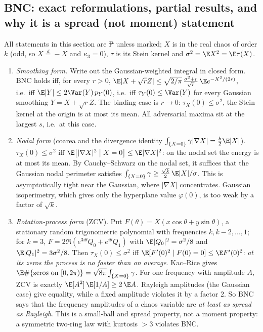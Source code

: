 \subsection{BNC: exact reformulations, partial results, and why it is a spread (not moment) statement}\label{sec:bnc-forms}
All statements in this section are \st{P} unless marked; $X$ is in the real chaos of order $k$ (odd, so $X\overset d=-X$ and $\kappa_3=0$), $\tau$ is its Stein kernel and $\sigma^2=\E X^2=\E\tau(X)$.
\begin{enumerate}
\item \emph{Smoothing form.} Write out the Gaussian-weighted integral in closed form. BNC holds iff, for every $r>0$,
$\E|X+\sqrt rZ|\le\sqrt{2/\pi}\,\frac{\sigma^2+r}{\sqrt r}\,\E e^{-X^2/(2r)}$, i.e.\ iff $\E|Y|\le2\Var(Y)\,p_Y(0)$, i.e.\ iff $\tau_Y(0)\le\Var(Y)$ for every Gaussian smoothing
$Y=X+\sqrt rZ$. The binding case is $r\to0$: $\tau_X(0)\le\sigma^2$, the Stein kernel at the origin is at most its mean. All adversarial maxima sit at the largest $s$, i.e.\ at this case.
\item \emph{Nodal form} (coarea and the divergence identity $\int_{\{X=0\}}\gamma|\nabla X|=\tfrac k2\E|X|$). $\tau_X(0)\le\sigma^2$ iff $\E\bigl[|\nabla X|^2\bigm|X=0\bigr]\le\E|\nabla X|^2$: on
the nodal set the energy is at most its mean. By Cauchy--Schwarz on the nodal set, it suffices that the Gaussian nodal perimeter satisfies $\int_{\{X=0\}}\gamma\ge\frac{\sqrt k}2\,\E|X|/\sigma$.
This is asymptotically tight near the Gaussian, where $|\nabla X|$ concentrates. Gaussian isoperimetry, which gives only the hyperplane value $\varphi(0)$, is too weak by a factor of $\sqrt k$.
\item \emph{Rotation-process form} (ZCV). Put $F(\theta)=X(x\cos\theta+y\sin\theta)$, a stationary random trigonometric polynomial with frequencies $k,k-2,\dots,1$; for $k=3$,
$F=2\Re(e^{3i\theta}Q_0+e^{i\theta}Q_1)$ with $\E|Q_0|^2=\sigma^2/8$ and $\E|Q_1|^2=3\sigma^2/8$. Then $\tau_X(0)\le\sigma^2$ iff $\E[F'(0)^2\mid F(0)=0]\le\E F'(0)^2$: \emph{at its zeros the
process is no faster than on average}. Kac--Rice gives $\E\#\{\text{zeros on }[0,2\pi)\}=\sqrt{8\pi}\int_{\{X=0\}}\gamma$. For one frequency with amplitude $A$, ZCV is exactly
$\E[A^2]\,\E[1/A]\ge2\,\E A$. Rayleigh amplitudes (the Gaussian case) give equality, while a fixed amplitude violates it by a factor $2$. So BNC says that the frequency amplitudes of a chaos
variable are \emph{at least as spread as Rayleigh}. This is a small-ball and spread property, not a moment property: a symmetric two-ring law with kurtosis $>3$ violates BNC.

\end{enumerate}
